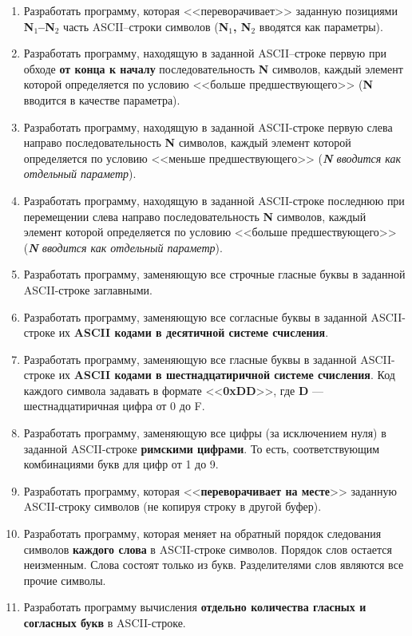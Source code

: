 \begin{enumerate}
    \item Разработать программу, которая <<переворачивает>> заданную позициями \textbf{N$_1$--N$_2$} часть ASCII--строки символов (\textbf{N$_1$, N$_2$} вводятся как параметры).
    \item Разработать программу, находящую в заданной ASCII--строке первую  при обходе \textbf{от конца к началу} последовательность \textbf{N} символов, каждый элемент которой определяется по условию <<больше предшествующего>> (\textbf{N} вводится в качестве параметра).
    \item Разработать программу, находящую в заданной ASCII-строке первую слева направо последовательность \textbf{N} символов, каждый элемент которой определяется по условию <<меньше предшествующего>> (\textit{\textbf{N} вводится как отдельный параметр}).
    \item Разработать программу, находящую в заданной ASCII-строке последнюю при перемещении слева направо последовательность \textbf{N} символов, каждый элемент которой определяется по условию <<больше предшествующего>> (\textit{\textbf{N} вводится как отдельный параметр}).
    \item Разработать программу, заменяющую все строчные гласные буквы в заданной ASCII-строке заглавными.
    \item Разработать программу, заменяющую все согласные буквы в заданной ASCII-строке их \textbf{ASCII кодами в десятичной системе счисления}.
    \item Разработать программу, заменяющую все гласные буквы в заданной ASCII-строке их \textbf{ASCII кодами в шестнадцатиричной системе счисления}. Код каждого символа задавать в формате <<\textbf{0xDD}>>, где \textbf{D} --- шестнадцатиричная цифра от 0 до F.
    \item Разработать программу, заменяющую все цифры (за исключением нуля) в заданной ASCII-строке \textbf{римскими цифрами}. То есть, соответствующим комбинациями букв для цифр от 1 до 9.
    \item Разработать программу, которая <<\textbf{переворачивает на месте}>> заданную ASCII-строку символов (не копируя строку в другой буфер).
    \item Разработать программу, которая меняет на обратный порядок следования символов \textbf{каждого слова} в ASCII-строке символов. Порядок слов остается неизменным. Слова состоят только из букв. Разделителями слов являются все прочие символы.
    \item Разработать программу вычисления \textbf{отдельно количества гласных и согласных букв} в ASCII-строке.

\end{enumerate}
